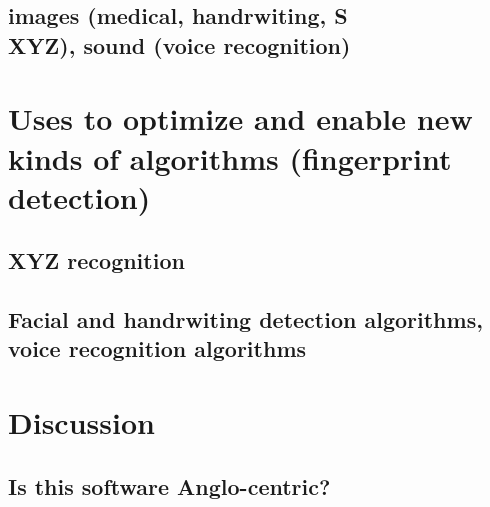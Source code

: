 \documentclass[12pt]{report}
\begin{document}
    \section{images (medical, handrwiting, S\\XYZ), sound (voice recognition)}
    \blindtext[1]
    
    \chapter{Uses to optimize and enable new kinds of algorithms (fingerprint detection)}
    \section{XYZ recognition}
    \blindtext[1]
    \section{Facial and handrwiting detection algorithms, voice recognition algorithms}
    \blindtext[1]

    \chapter{Discussion}
    \section{Is this software Anglo-centric?}
    \blindtext[1]
    
    \pagebreak

    \chapter{}
\end{document}
